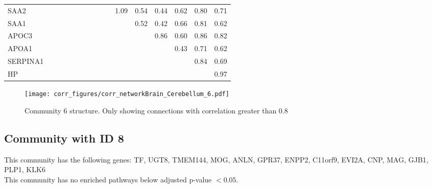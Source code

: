\begin{longtable}{lrrrrrrrrrrrrrrr}
SAA2     &             &            &           &           &           &           &            &            &            &       1.09 &        0.54 &        0.44 &           0.62 &     0.80 &       0.71 \\
SAA1     &             &            &           &           &           &           &            &            &            &            &        0.52 &        0.42 &           0.66 &     0.81 &       0.62 \\
APOC3    &             &            &           &           &           &           &            &            &            &            &             &        0.86 &           0.60 &     0.86 &       0.82 \\
APOA1    &             &            &           &           &           &           &            &            &            &            &             &             &           0.43 &     0.71 &       0.62 \\
SERPINA1 &             &            &           &           &           &           &            &            &            &            &             &             &                &     0.84 &       0.69 \\
HP       &             &            &           &           &           &           &            &            &            &            &             &             &                &          &       0.97 \\
\end{longtable}


\begin{figure}[h!]
\centering
\texttt{[image: corr\_figures/corr\_networkBrain\_Cerebellum\_6.pdf]}
\caption{Community 6 structure. Only showing connections with correlation greater than 0.8}
\end{figure}




\subsection*{Community with ID 8}
This community has the following genes: TF, UGT8, TMEM144, MOG, ANLN, GPR37, ENPP2, C11orf9, EVI2A, CNP, MAG, GJB1, PLP1, KLK6
\\
This community has no enriched pathways below adjusted p-value $< 0.05$.

